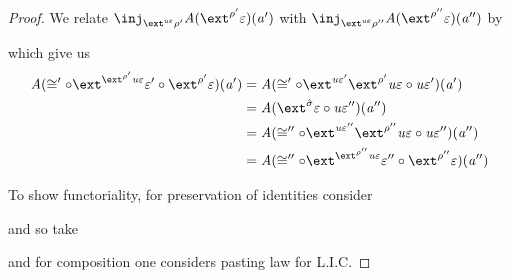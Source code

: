 \begin{proof}
    We relate $\inj_{\ext^{\tinstU\me}\rho'}\vA(\ext^{\rho'}\me)(\va')$ with $\inj_{\ext^{\tinstU\me}\rho''}\vA(\ext^{\rho''}\me)(\va'')$ by
    \begin{center}
    \end{center}
    which give us
    \begin{align*}
        \vA(\iso' \comp \ext^{\ext^{\rho'}\tinstU\me}\me' \comp \ext^{\rho'}\me)(\va') 
                &= \vA(\iso' \comp \ext^{\tinstU\me'}\ext^{\rho'}\tinstU\me \comp \tinstU\me')(\va') \\
                &= \vA(\ext^{\hat\sigma}\me \comp \tinstU\me'')(\va'') \\
                &= \vA(\iso'' \comp \ext^{\tinstU\me''}\ext^{\rho''}\tinstU\me \comp \tinstU\me'')(\va'') \\
                &= \vA(\iso'' \comp \ext^{\ext^{\rho''}\tinstU\me}\me'' \comp \ext^{\rho''}\me)(\va'')
    \end{align*}

    To show functoriality, for preservation of identities consider
    and so take
    and for composition one considers pasting law for L.I.C. 


\end{proof}

